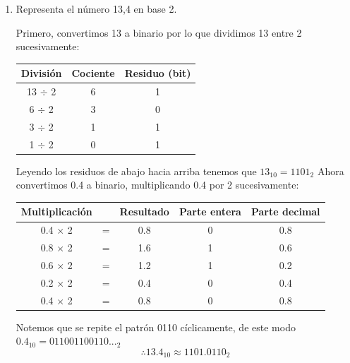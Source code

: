 \documentclass[12pt,letterpaper]{article}
\begin{document}
\begin{enumerate}
  \item Representa el número 13,4 en base 2.
    
    \bigskip
    Primero, convertimos 13 a binario por lo que dividimos 13 entre 2 sucesivamente:
    \begin{table}[H]
      \begin{center}
        \begin{tabular}{| c | c | c |}
          
          \hline
          
          \textbf{Divisi\'{o}n} & \textbf{Cociente} & \textbf{Residuo (bit)} \\ \hline
          13 $\div$ 2 & 6 & 1 \\ \hline
          6 $\div$ 2 & 3 & 0 \\ \hline
          3 $\div$ 2 & 1 & 1 \\ \hline
          1 $\div$ 2 & 0 & 1 \\ \hline
        \end{tabular}
      \end{center}
    \end{table}

    Leyendo los residuos de abajo hacia arriba tenemos que $13_{10} = 1101_2$
    Ahora convertimos 0.4 a binario, multiplicando 0.4 por 2 sucesivamente:
    \begin{table}[H]
      \begin{center}
        \begin{tabular}{| c | c | c | c | c |}
          
          \hline
          
          \textbf{Multiplicaci\'{o}n} & & \textbf{Resultado} & \textbf{Parte entera} & \textbf{Parte decimal} \\ \hline
          0.4 $\times$ 2 & = & 0.8 & 0 & 0.8 \\ \hline
          0.8 $\times$ 2 & = & 1.6 & 1 & 0.6 \\ \hline
          0.6 $\times$ 2 & = & 1.2 & 1 & 0.2 \\ \hline
          0.2 $\times$ 2 & = & 0.4 & 0 & 0.4 \\ \hline
          0.4 $\times$ 2 & = & 0.8 & 0 & 0.8 \\ \hline
        \end{tabular}
      \end{center}
    \end{table}
    Notemos que se repite el patrón 0110 c\'{i}clicamente, de este modo $0.4_{10} = 011001100110..._2$
    \[
    \therefore 13.4_{10} \approx 1101.0110_2
    \]
    

\end{enumerate}
\end{document}
